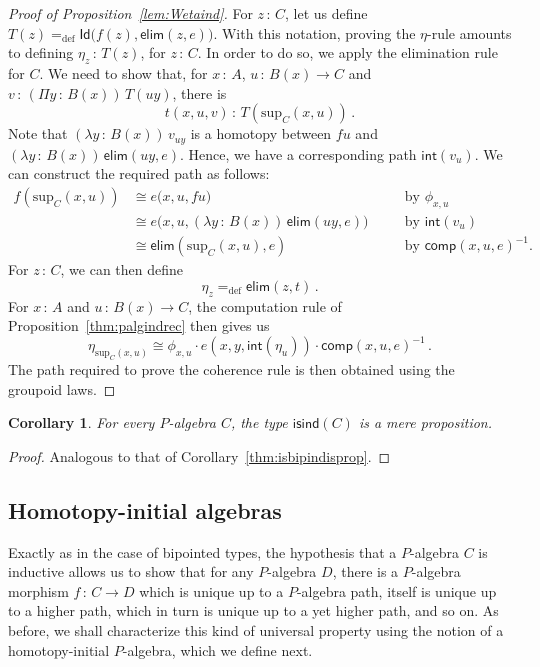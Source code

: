 \documentclass[10pt,a4paper,oneside,reqno]{amsart}
\numberwithin{equation}{section}
\theoremstyle{mythm}
\newtheorem{corollary}[theorem]{Corollary}
\theoremstyle{mydef}
\theoremstyle{myrmk}
\newcommand{\by}[1]{\quad&&\text{by {$#1$}}}
\newcommand{\defeq}{=_{\mathrm{def}}}
\newcommand{\co}{\,{:}\,}
\newcommand{\iso}{\cong}
\newcommand{\isind}{\mathsf{isind}}
\renewcommand{\int}{\mathsf{int}}
\newcommand{\Id}{\mathsf{Id}}
\newcommand{\elim}{\mathsf{elim}}
\newcommand{\comp}{\mathsf{comp}}
\renewcommand{\sup}{\mathrm{sup}}
\begin{document}
\begin{proof}[Proof of Proposition~\ref{lem:Wetaind}]  For $z \co C$, let us define $T(z) \defeq \Id \big(   f(z), \elim(z,e))$. With this notation, proving
 the $\eta$-rule amounts to defining $\eta_z \co T(z)$, for $z \co C$. In order to do so, we apply
the elimination rule for $C$. We need to show that, for $x \co A$, $u \co B(x) \to C$ and~$v \co 
(\Pi y \co B(x)) \, T(uy)$, there 
is 
\[
t(x,u,v) \co   T(\sup_C(x,u)) \, .
\]
Note that $(\lambda y \co B(x)) \, v_{uy}$ is a homotopy between $fu$ and $(\lambda y \co B(x)) \, \elim(uy, e)$.
Hence, we have a corresponding path $\int(v_u)$. We can construct the required path  as follows:
\begin{align*}
f(\sup_C(x,u)) &\iso e\big(x,u , f u \big)   \by{\phi_{x,u}}\\
	&\iso e\big(x,u, (\lambda y \co B(x) )\, \elim(u y ,e) \big) \by{\int( v_u)} \\
	& \iso \elim(\sup_C(x,u),e) \by{\comp(x,u,e)^{-1}}.
\end{align*}
For $z \co C$, we can then define
\[
\eta_z \defeq \elim(z,t) \, .
\] 
For $x \co A$ and $u \co B(x) \to C$, the  computation rule of Proposition~\ref{thm:palgindrec} then gives us
\[
 \eta_{\sup_C(x,u)} \iso \phi_{x,u} \cdot e(x,y,\int(  \eta_u ))  \cdot  \comp(x,u,e)^{-1} \, .
\]
The path required to prove  the coherence rule is then obtained using the groupoid laws.
\end{proof}


\begin{corollary} For every $P$-algebra $C$, the type $\isind(C)$ is a mere proposition.
\end{corollary}

\begin{proof} Analogous to that of Corollary~\ref{thm:isbipindisprop}.
\end{proof} 

\subsection*{Homotopy-initial algebras}
Exactly as in the case of bipointed types, the hypothesis that a $P$-algebra $C$ is inductive allows us to show that for any
$P$-algebra $D$, there is a $P$-algebra morphism $f \co C \to D$ which is unique up to a $P$-algebra path, itself is unique up 
to a higher path, which in turn is unique up to a yet higher path, and so on.  As before, we shall characterize this kind of universal property
using the notion of a homotopy-initial $P$-algebra, which we define next.
\end{document}
